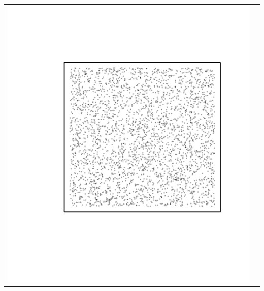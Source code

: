 \documentclass{article}\usepackage{graphicx, color}
\makeatletter
\def\maxwidth{ %
  \ifdim\Gin@nat@width>\linewidth
    \linewidth
  \else
    \Gin@nat@width
  \fi
}
\newenvironment{knitrout}{}{} %
\makeatother
\begin{document}
\vspace*{-1.75in}
\begin{tabular}{cc}
\begin{knitrout}
\definecolor{shadecolor}{rgb}{0.969, 0.969, 0.969}\color{fgcolor}\includegraphics[width=\maxwidth]{figure/unnamed-chunk-23} 
\end{knitrout}


\end{tabular}
\end{document}
